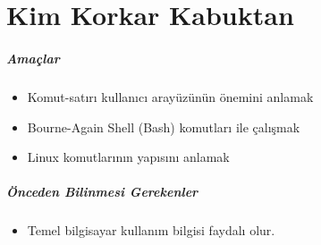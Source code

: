\chapter{Kim Korkar Kabuktan}
\label{chap:bolum4}
\paragraph{Amaçlar}
\begin{itemize}
 \item Komut-satırı kullanıcı arayüzünün önemini anlamak
 \item Bourne-Again Shell (Bash) komutları ile çalışmak
 \item Linux komutlarının yapısını anlamak
 \end{itemize}
 
\paragraph{Önceden Bilinmesi Gerekenler}
\begin{itemize}
 \item Temel bilgisayar kullanım bilgisi faydalı olur.
 \end{itemize}

